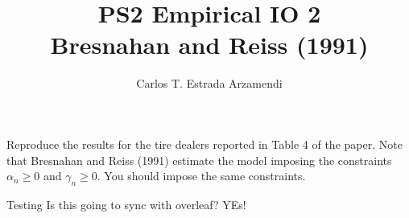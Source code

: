\documentclass[12pt]{article}
\title{\vspace{-2cm}\textbf{PS2 Empirical IO 2}\\
Bresnahan and Reiss (1991)}
\author{Carlos T. Estrada Arzamendi}
\begin{document}
\maketitle

\section{}
Reproduce the results for the tire dealers reported in Table 4 of the paper. Note that
Bresnahan and Reiss (1991) estimate the model imposing the constraints $\alpha_n \geq 0$  and
$\gamma_n \geq 0$. You should impose the same constraints.

Testing Is this going to sync with overleaf? YEs!
\end{document}
